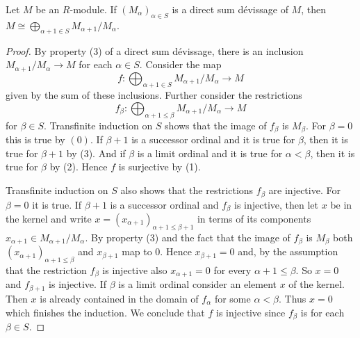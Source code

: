 \begin{lemma}
\label{lemma-direct-sum-devissage}
Let $M$ be an $R$-module.  If $(M_{\alpha})_{\alpha \in S}$ is a direct sum
d\'evissage of $M$, then
$M \cong \bigoplus_{\alpha + 1 \in S} M_{\alpha + 1}/M_{\alpha}$.
\end{lemma}

\begin{proof}
By property (3) of a direct sum d\'evissage, there is an inclusion
$M_{\alpha + 1}/M_{\alpha} \to M$ for each $\alpha \in S$.  Consider the
map
$$
f : \bigoplus\nolimits_{\alpha + 1\in S} M_{\alpha + 1}/M_{\alpha} \to M
$$
given by the sum of these inclusions.
Further consider the restrictions
$$
f_{\beta} :
\bigoplus\nolimits_{\alpha + 1 \leq \beta} M_{\alpha + 1}/M_{\alpha}
\longrightarrow
M
$$
for $\beta\in S$. Transfinite induction on $S$ shows that the image of
$f_{\beta}$ is $M_{\beta}$. For $\beta=0$ this is true by $(0)$. If $\beta+1$
is a successor ordinal and it is true for $\beta$, then it is true for 
$\beta + 1$ by (3).  And if $\beta$ is a limit ordinal and it is true for
$\alpha < \beta$, then it is true for $\beta$ by (2). Hence $f$ is surjective
by (1).  

\medskip\noindent
Transfinite induction on $S$ also shows that the restrictions $f_{\beta}$
are injective. For $\beta = 0$ it is true. If $\beta+1$ is a
successor ordinal and $f_{\beta}$ is injective, then let $x$ be in the kernel
and write $x = (x_{\alpha + 1})_{\alpha + 1 \leq \beta + 1}$ in terms of its
components $x_{\alpha + 1} \in M_{\alpha + 1}/M_{\alpha}$.  By property (3) and
the fact that the image of $f_{\beta}$ is $M_{\beta}$ both
$(x_{\alpha + 1})_{\alpha + 1 \leq \beta}$ and $x_{\beta + 1}$ map to $0$.
Hence $x_{\beta+1} = 0$ and, by the assumption that the restriction
$f_{\beta}$ is injective also $x_{\alpha + 1} = 0$
for every $\alpha + 1 \leq \beta$.  So $x = 0$ and $f_{\beta+1}$ is injective.
If $\beta$ is a limit ordinal consider an element $x$ of the kernel. Then $x$
is already contained in the domain of $f_{\alpha}$ for some $\alpha < \beta$.
Thus $x = 0$ which finishes the induction.
We conclude that $f$ is injective since $f_{\beta}$ is for each $\beta \in S$.
\end{proof}
